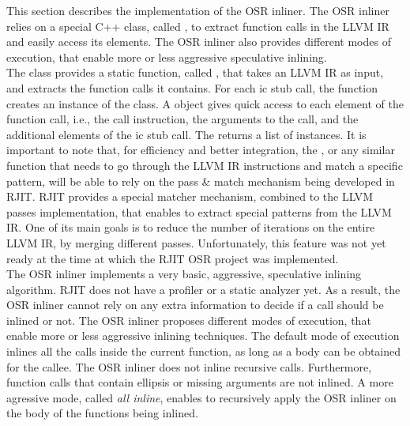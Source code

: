 This section describes the implementation of the OSR inliner.
The OSR inliner relies on a special C++ class, called , to extract function calls in the LLVM IR and easily access its elements. 
The OSR inliner also provides different modes of execution, that enable more or less aggressive speculative inlining.\\

The  class provides a static function, called , that takes an LLVM IR as input, and extracts the function calls it contains.
For each ic stub call, the function creates an instance of the  class. 
A  object gives quick access to each element of the function call, i.e., the  call instruction, the arguments to the call, and the additional elements of the ic stub call.
The  returns a list of  instances.
It is important to note that, for efficiency and better integration, the , or any similar function that needs to go through the LLVM IR instructions and match a specific pattern, will be able to rely on the pass \& match mechanism being developed in RJIT.
RJIT provides a special matcher mechanism, combined to the LLVM passes implementation, that enables to extract special patterns from the LLVM IR.
One of its main goals is to reduce the number of iterations on the entire LLVM IR, by merging different passes.
Unfortunately, this feature was not yet ready at the time at which the RJIT OSR project was implemented.\\

The OSR inliner implements a very basic, aggressive, speculative inlining algorithm. 
RJIT does not have a profiler or a static analyzer yet.
As a result, the OSR inliner cannot rely on any extra information to decide if a call should be inlined or not.
The OSR inliner proposes different modes of execution, that enable more or less aggressive inlining techniques.
The default mode of execution inlines all the calls inside the current function, as long as a body can be obtained for the callee.
The OSR inliner does not inline recursive calls.
Furthermore, function calls that contain ellipsis or missing arguments are not inlined.
A more agressive mode, called \textit{all inline}, enables to recursively apply the OSR inliner on the body of the functions being inlined.
\\


